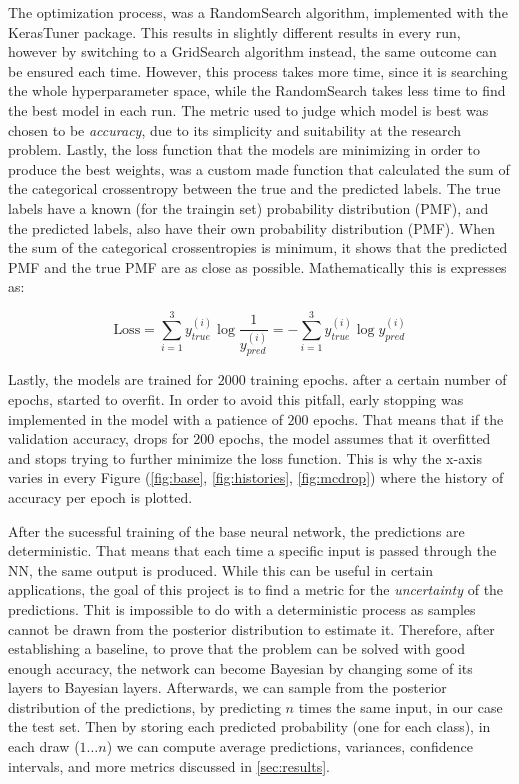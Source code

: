 \documentclass[11pt,twoside]{article}
\numberwithin{Theorem}{section}
\numberwithin{Definition}{section}
\numberwithin{Lemma}{section}
\numberwithin{Algorithm}{section}
\numberwithin{equation}{section}
\begin{document}
The optimization process, was a \textsf{RandomSearch} algorithm, implemented with the \textsf{KerasTuner} package. This results in slightly different results in every run, however by switching to a \textsf{GridSearch} algorithm instead, the same outcome can be ensured each time. However, this process takes more time, since it is searching the whole hyperparameter space, while the \textsf{RandomSearch} takes less time to find the best model in each run. The metric used to judge which model is best was chosen to be \textit{accuracy}, due to its simplicity and suitability at the research problem. Lastly, the loss function that the models are minimizing in order to produce the best weights, was a custom made function that calculated the sum of the categorical crossentropy between the true and the predicted labels. The true labels have a known (for the traingin set) probability distribution (PMF), and the predicted labels, also have their own probability distribution (PMF). When the sum of the categorical crossentropies is minimum, it shows that the predicted PMF and the true PMF are as close as possible. Mathematically this is expresses as: 

\begin{equation}
\text{Loss} = \sum_{i=1}^{3} y_{true}^{(i)} \log{\frac{1}{y_{pred}^{(i)}}}  = -\sum_{i=1}^{3} y_{true}^{(i)} \log y_{pred}^{(i)} 
\end{equation}

Lastly, the models are trained for $2000$ training epochs. after a certain number of epochs, started to overfit. In order to avoid this pitfall, early stopping was implemented in the model with a patience of $200$ epochs. That means that if the validation accuracy, drops for $200$ epochs, the model assumes that it overfitted and stops trying to further minimize the loss function. This is why the x-axis varies in every Figure (\autoref{fig:base}, \autoref{fig:histories}, \autoref{fig:mcdrop}) where the history of accuracy per epoch is plotted. 

After the sucessful training of the base neural network, the predictions are deterministic. That means that each time a specific input is passed through the NN, the same output is produced. While this can be useful in certain applications, the goal of this project is to find a metric for the \textit{uncertainty} of the predictions. Thit is impossible to do with a deterministic process as samples cannot be drawn from  the posterior distribution to estimate it.  Therefore, after establishing a baseline, to prove that the problem can be solved with good enough accuracy, the network can become Bayesian by changing some of its layers to Bayesian layers. Afterwards, we can sample from the posterior distribution of the predictions, by predicting $n$ times the same input, in our case the test set. Then by storing each predicted probability (one for each class), in each draw ($1 \dots n$) we can compute average predictions, variances, confidence intervals, and more metrics discussed in \autoref{sec:results}. 
\end{document}
